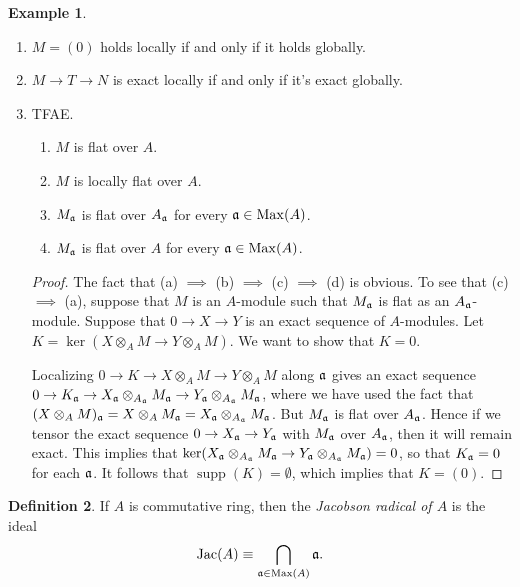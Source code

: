 \documentclass[10pt,letterpaper,cm]{nupset}
\theoremstyle{definition}
\newtheorem{definition}{Definition}[subsection]
\newtheorem{exmp}[definition]{Example}
\theoremstyle{theorem}
\theoremstyle{remark}
\newcommand{\1}{\mathbf{1}}
\newcommand{\0}{\vec 0}
\DeclareMathOperator{\Jac}{Jac}
\DeclareMathOperator{\Max}{Max}
\DeclareMathOperator{\supp}{supp}
\begin{document}
\begin{exmp} $ $
\begin{enumerate}
\item $M = (0)$ holds locally if and only if it holds globally. 
\item $M \to T \to N$ is exact locally if and only if it's exact globally. 
\item TFAE.
\begin{enumerate}
\item $M$ is flat over $A$.  
\item $M$ is locally flat over $A$. 
\item $M_{\frak{a}}$ is flat over $A_{\frak{a}}$ for every $\frak{a} \in \Max(A)$. 
\item $M_{\frak{a}}$ is flat over $A$ for every $\frak{a} \in \Max(A)$. 
\end{enumerate}
\begin{proof}
The fact that (a) $\implies$ (b) $\implies$ (c) $\implies$ (d) is obvious. To see that (c) $\implies$ (a), suppose that $M$ is an $A$-module such that $M_{\frak{a}}$ is flat  as an $A_{\frak{a}}$-module. 
Suppose that $0 \to X \to Y$ is an exact sequence of $A$-modules. Let $K = \ker( X \otimes_A M \to Y \otimes_A M)$. We want to show that $K=0$.   

Localizing $0 \to K \to X \otimes_A M \to Y \otimes_A M$ along $\frak{a}$ gives an exact sequence $0 \to K_{\frak{a}} \to X_{\frak{a}} \otimes_{A_{\frak{a}}} M_{\frak{a}} \to Y_{\frak{a}} \otimes_{A_{\frak{a}}} M_{\frak{a}}$, where we have used the fact that $(X \otimes_A M)_{\frak{a}} = X \otimes_A M_{\frak{a}} = X_{\frak{a}} \otimes_{A_{\frak{a}}} M_{\frak{a}}$. But $M_{\frak{a}}$ is flat over $A_{\frak{a}}$. Hence if we tensor the exact sequence $0 \to X_{\frak{a}} \to Y_{\frak{a}}$ with $M_{\frak{a}}$ over $A_{\frak{a}}$, then it will remain exact. This implies that $\ker(X_{\frak{a}} \otimes_{A_{\frak{a}}} M_{\frak{a}} \to Y_{\frak{a}} \otimes_{A_{\frak{a}}} M_{\frak{a}}) =0$, so that $K_{\frak{a}} = 0$ for each $\frak{a}$. It follows that $\supp(K) = \emptyset$, which implies that $K= (0)$. 
\end{proof}
\end{enumerate}
\end{exmp}

\begin{definition}
If $A$ is commutative ring, then the \textit{Jacobson radical of $A$} is the ideal $$\Jac(A) \equiv \bigcap_{\frak{a} \in \Max(A)} \frak{a} .$$
\end{definition}
\end{document}
